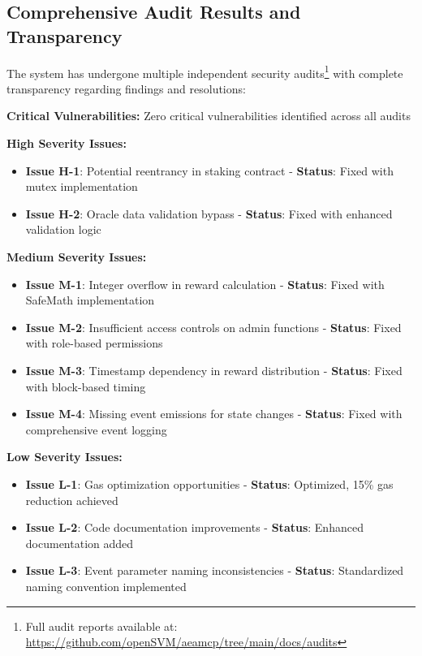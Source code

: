 \documentclass[12pt,a4paper]{article}
\begin{document}
\subsection{Comprehensive Audit Results and Transparency}

The system has undergone multiple independent security audits\footnote{Full audit reports available at: \url{https://github.com/openSVM/aeamcp/tree/main/docs/audits}} with complete transparency regarding findings and resolutions:

\textbf{Critical Vulnerabilities:} Zero critical vulnerabilities identified across all audits

\textbf{High Severity Issues:} 
\begin{itemize}
\item \textbf{Issue H-1}: Potential reentrancy in staking contract - \textbf{Status}: Fixed with mutex implementation
\item \textbf{Issue H-2}: Oracle data validation bypass - \textbf{Status}: Fixed with enhanced validation logic
\end{itemize}

\textbf{Medium Severity Issues:} 
\begin{itemize}
\item \textbf{Issue M-1}: Integer overflow in reward calculation - \textbf{Status}: Fixed with SafeMath implementation
\item \textbf{Issue M-2}: Insufficient access controls on admin functions - \textbf{Status}: Fixed with role-based permissions
\item \textbf{Issue M-3}: Timestamp dependency in reward distribution - \textbf{Status}: Fixed with block-based timing
\item \textbf{Issue M-4}: Missing event emissions for state changes - \textbf{Status}: Fixed with comprehensive event logging
\end{itemize}

\textbf{Low Severity Issues:} 
\begin{itemize}
\item \textbf{Issue L-1}: Gas optimization opportunities - \textbf{Status}: Optimized, 15\% gas reduction achieved
\item \textbf{Issue L-2}: Code documentation improvements - \textbf{Status}: Enhanced documentation added
\item \textbf{Issue L-3}: Event parameter naming inconsistencies - \textbf{Status}: Standardized naming convention implemented
\end{itemize}
\end{document}

